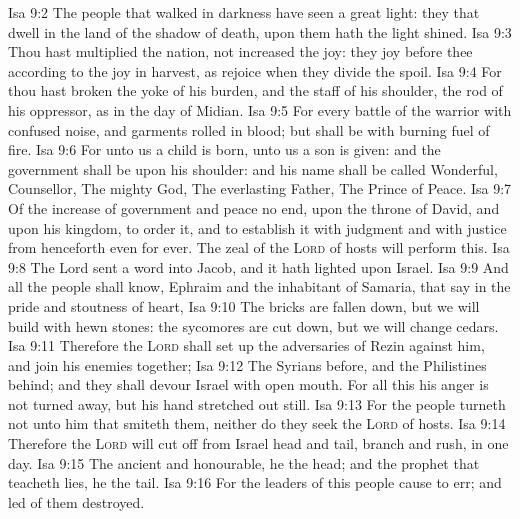 \vs Isa 9:2 The people that walked in darkness have seen a great light: they that dwell in the land of the shadow of death, upon them hath the light shined.
\vs Isa 9:3 Thou hast multiplied the nation,  not increased the joy: they joy before thee according to the joy in harvest,  as  rejoice when they divide the spoil.
\vs Isa 9:4 For thou hast broken the yoke of his burden, and the staff of his shoulder, the rod of his oppressor, as in the day of Midian.
\vs Isa 9:5 For every battle of the warrior  with confused noise, and garments rolled in blood; but  shall be with burning  fuel of fire.
\vs Isa 9:6 For unto us a child is born, unto us a son is given: and the government shall be upon his shoulder: and his name shall be called Wonderful, Counsellor, The mighty God, The everlasting Father, The Prince of Peace.
\vs Isa 9:7 Of the increase of  government and peace  no end, upon the throne of David, and upon his kingdom, to order it, and to establish it with judgment and with justice from henceforth even for ever. The zeal of the \textsc{Lord} of hosts will perform this.
\vs Isa 9:8 The Lord sent a word into Jacob, and it hath lighted upon Israel.
\vs Isa 9:9 And all the people shall know,  Ephraim and the inhabitant of Samaria, that say in the pride and stoutness of heart,
\vs Isa 9:10 The bricks are fallen down, but we will build with hewn stones: the sycomores are cut down, but we will change  cedars.
\vs Isa 9:11 Therefore the \textsc{Lord} shall set up the adversaries of Rezin against him, and join his enemies together;
\vs Isa 9:12 The Syrians before, and the Philistines behind; and they shall devour Israel with open mouth. For all this his anger is not turned away, but his hand  stretched out still.
\vs Isa 9:13 For the people turneth not unto him that smiteth them, neither do they seek the \textsc{Lord} of hosts.
\vs Isa 9:14 Therefore the \textsc{Lord} will cut off from Israel head and tail, branch and rush, in one day.
\vs Isa 9:15 The ancient and honourable, he  the head; and the prophet that teacheth lies, he  the tail.
\vs Isa 9:16 For the leaders of this people cause  to err; and  led of them  destroyed.
